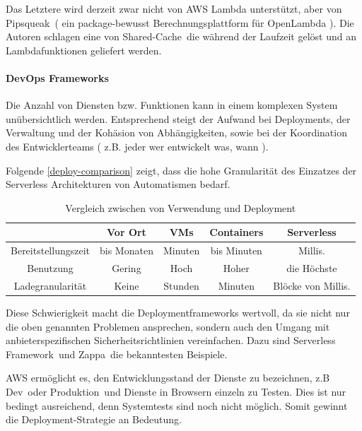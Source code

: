 \documentclass[
12pt,
english,
ngerman,
headsepline,
twoside,
openright,
numbers=noenddot,version=first
]{scrreprt}
\providecommand{\tabularnewline}{\\}
\begin{document}
Das Letztere wird derzeit zwar nicht von \acrshort{AWS} Lambda unterstützt, aber von \glqq Pipsqueak\grqq\ ( ein package-bewusst Berechnungsplattform für OpenLambda \cite{lambdaBibliothek} ). Die Autoren schlagen eine von \glqq Shared-Cache\grqq\, die während der Laufzeit gelöst und an Lambdafunktionen geliefert werden.

\paragraph{DevOps Frameworks}
Die Anzahl von Diensten bzw. Funktionen kann in einem komplexen System unübersichtlich werden. Entsprechend steigt der Aufwand bei Deployments, der Verwaltung und der Kohäsion von Abhängigkeiten, sowie bei der Koordination des Entwicklerteams ( z.B. jeder wer entwickelt was, wann ). 

Folgende \autoref{deploy-comparison} zeigt, dass die hohe Granularität des Einzatzes der Serverless Architekturen von Automatismen bedarf.

\begin{table}
	\centering{}
	\begin{tabular}{c | c c c c}
		\noalign{\vskip\doublerulesep}
		& Vor Ort & VMs & Containers & Serverless \tabularnewline[\doublerulesep]
		\hline
		\noalign{\vskip\doublerulesep}
		Bereitstellungszeit & bis Monaten & Minuten & bis Minuten & Millis. \tabularnewline[\doublerulesep]
		\noalign{\vskip\doublerulesep}
		\noalign{\vskip\doublerulesep}
		Benutzung & Gering & Hoch & Hoher & die Höchste \tabularnewline[\doublerulesep]
		\noalign{\vskip\doublerulesep}
		Ladegranularität & Keine & Stunden & Minuten &  Blöcke von Millis.\tabularnewline[\doublerulesep]
	\end{tabular}
\caption{Vergleich zwischen  von Verwendung und Deployment }
\label{deploy-comparison}
\end{table} \cite{servStatus}

Diese Schwierigkeit macht die Deploymentframeworks wertvoll, da sie nicht nur die oben genannten Problemen ansprechen, sondern auch den Umgang mit anbieterspezifischen Sicherheitsrichtlinien vereinfachen. Dazu sind \glqq Serverless Framework\grqq\ und \glqq Zappa\grqq\ die bekanntesten Beispiele.

\acrshort{AWS} ermöglicht es, den Entwicklungsstand der Dienste zu bezeichnen, z.B \glqq Dev\grqq\ oder \glqq Produktion\grqq\ und Dienste in Browsern einzeln zu Testen. Dies ist nur bedingt ausreichend, denn Systemtests sind noch nicht möglich. Somit gewinnt die Deployment-Strategie an Bedeutung.
\end{document}
